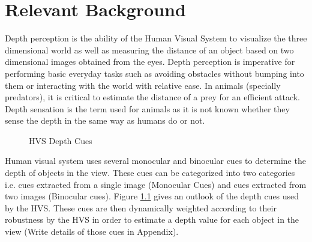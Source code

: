 \chapter{Relevant Background}
\label{chap:reletiveBackground}

Depth perception is the ability of the Human Visual System  to visualize the three dimensional world as well as measuring the distance of an object based on two dimensional images obtained from the eyes. Depth perception is imperative for performing basic everyday tasks such as avoiding obstacles without bumping into them or interacting with the world with relative ease. In animals (specially predators), it is critical to estimate the distance of a prey for an efficient attack. Depth sensation is the term used for animals as it is not known whether they sense the depth in the same way as humans do or not\cite{ wiki:depth_perception}.

\begin{figure}
\caption{HVS Depth Cues\label{fig:CueTree}}
\end{figure}

Human visual system  uses several monocular and binocular cues to determine the depth of objects in the view. These cues can be categorized into two categories i.e. cues extracted from a single image (Monocular Cues) and cues extracted from two images (Binocular cues)\cite{depthcues1}\cite{ wiki:depth_perception}. Figure \ref{fig:CueTree} gives an outlook of the depth cues used by the HVS. These cues are then dynamically weighted according to their robustness by the HVS in order to estimate a depth value for each object in the view \cite{CueFusion}(Write details of those cues in Appendix).


